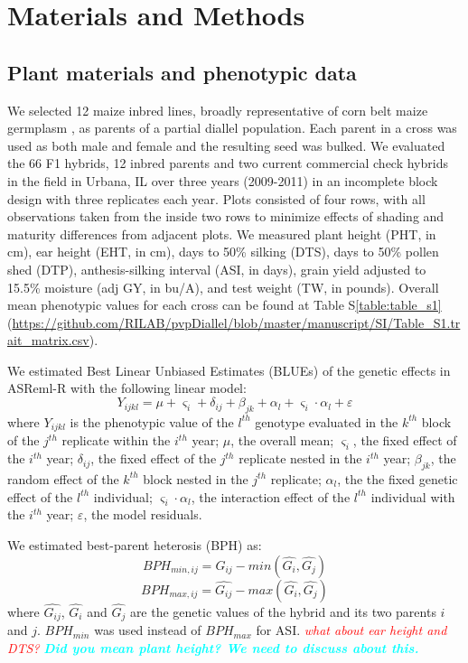 \documentclass[9pt,twocolumn,twoside]{gsajnl}
\newcommand{\yang}[1]{\textcolor{cyan}{\emph{\bf  #1}} }
\newcommand{\jri}[1]{\textcolor{red}{ \emph{ #1}} }
\begin{document}
\section*{Materials and Methods} 

\subsection*{Plant materials and phenotypic data}
We selected 12 maize inbred lines, broadly representative of corn belt maize germplasm \citep{mikel2006evolution}, as parents of a partial diallel population. 
Each parent in a cross was used as both male and female and the resulting seed was bulked. 
We evaluated the 66 F1 hybrids, 12 inbred parents and two current commercial check hybrids in the field in Urbana, IL over three years (2009-2011) in an incomplete block design with three replicates each year.  
Plots consisted of four rows, with all observations taken from the inside two rows to minimize effects of shading and maturity differences from adjacent plots.  
We measured plant height (PHT, in cm), ear height (EHT, in cm), days to 50\% silking (DTS), days to 50\% pollen shed (DTP), anthesis-silking interval (ASI, in days), grain yield adjusted to 15.5\% moisture (adj GY, in bu/A), and test weight (TW, in pounds). 
Overall mean phenotypic values for each cross can be found at Table S\ref{table:table_s1} (\url{https://github.com/RILAB/pvpDiallel/blob/master/manuscript/SI/Table_S1.trait_matrix.csv}).

We estimated Best Linear Unbiased Estimates (BLUEs) of the genetic effects in ASReml-R \citep{gilmour2009asreml} with the following linear model: 
%
\[Y_{ijkl} = \mu + \varsigma_{i} + \delta_{ij} + \beta_{jk} + \alpha_{l} +  \varsigma_{i} \cdot \alpha_{l} + \varepsilon\]
%
where 
$Y_{ijkl}$ is the phenotypic value of the $l^{th}$ genotype evaluated in the $k^{th}$ block of the $j^{th}$ replicate within the $i^{th}$ year; 
$\mu$, the overall mean; 
$\varsigma_{i}$, the fixed effect of the $i^{th}$ year;
$\delta_{ij}$, the fixed effect of the $j^{th}$ replicate nested in the $i^{th}$ year; 
$\beta_{jk}$, the random effect of the $k^{th}$ block nested in the $j^{th}$ replicate; 
$\alpha_{l}$, the the fixed genetic effect  of the $l^{th}$ individual; 
$\varsigma_{i} \cdot \alpha_{l}$, the interaction effect of the $l^{th}$ individual with the $i^{th}$ year; 
$\varepsilon$, the model residuals. 

We estimated best-parent heterosis (BPH) as:
%
\[ BPH_{min,ij}=\hat{G_{ij}}-min(\hat{G_{i}} ,\hat{G_{j}}) \] 
\[ BPH_{max,ij}=\hat{G_{ij}}-max(\hat{G_{i}} ,\hat{G_{j}}) \]
%
where $\hat{G_{ij}}$, $\hat{G_{i}}$ and $\hat{G_{j}}$ are the genetic values of the hybrid and its two parents $i$ and $j$. $BPH_{min}$ was used instead of $BPH_{max}$ for ASI. \jri{what about ear height and DTS?} \yang{Did you mean plant height? We need to discuss about this.}
\end{document}
